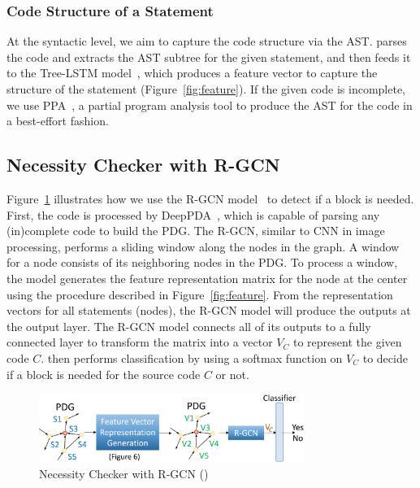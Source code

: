 \vspace{-1pt}
\subsubsection{Code Structure of a Statement}

At the syntactic level, we aim to capture the code structure via the
AST. {\tool} parses the code and extracts the AST subtree for the
given statement, and then feeds it to the Tree-LSTM
model~\cite{tai2015improved}, which produces a feature vector to
capture the structure of the statement (Figure~\ref{fig:feature}). If
the given code is incomplete, we use PPA~\cite{dagenais-oopsla08}, a
partial program analysis tool to produce the AST for the code in a
best-effort fashion.


\subsection{ Necessity Checker with R-GCN}
\label{model:sec}



Figure~\ref{fig:gcn} illustrates how we use the R-GCN model~\cite{rgcn} to
detect if a  block is needed.
First, the code is processed by DeepPDA~\cite{icse23}, which is
capable of parsing any (in)complete code to build the PDG. The
R-GCN, similar to CNN in image processing, performs a sliding
window along the nodes in the graph. A window for a node consists of
its neighboring nodes in the PDG.
To process a window, the model generates the feature representation
matrix for the node at the center using the procedure described in
Figure~\ref{fig:feature}.
From the representation vectors for all statements (nodes), the R-GCN
model will produce the outputs at the output layer. The R-GCN model
connects all of its outputs to a fully connected layer to transform
the matrix into a vector $V_C$ to represent the given code
$C$. {\tool} then performs classification by using a softmax function
on $V_C$ to decide if a  block is needed for the
source code $C$ or not.

\begin{figure}[t]
	\centering
	\includegraphics[width=3.4in]{xblock.png}
	\caption{ Necessity Checker with R-GCN ({\xblock})}
	\label{fig:gcn}	
\end{figure}

